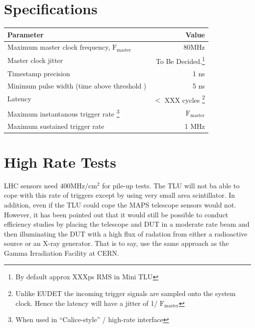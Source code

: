 \section{Specifications}

\begin{tabular}{| l | r |}

\hline

Parameter                                                  & Value \\ \hline \hline

Maximum master clock frequency, $\mathrm{F}_\mathrm{master}$ &  80MHz \\ \hline

Master clock jitter                                        & To Be Decided.\footnote{By default approx XXXps RMS in Mini TLU} \\ \hline

Timestamp precision                                        & 1 ns \\ \hline

Minimum pulse width (time above threshold )                & 5 ns \\ \hline

Latency                                                    &  $<$ XXX cycles \footnote{Unlike EUDET the incoming trigger signals are sampled onto the system clock. Hence the latency will have a jitter of 1/  $\mathrm{F}_\mathrm{master}$} \\ \hline

Maximum instantanous trigger rate \footnote{When used in ``Calice-style'' / high-rate interface}                                                       &  $\mathrm{F}_\mathrm{master}$ \\ \hline

Maximum sustained trigger rate                             &  1 MHz \\ \hline
\end{tabular}

\section{High Rate Tests}

LHC sensors need $400 \mathrm{MHz}/\mathrm{cm}^2$ for pile-up
tests. The TLU will not ba able to cope with this rate of triggers
except by using very small area scintillator. In addition, even if the
TLU could cope the MAPS telescope sensors would not. However, it has
been pointed out\cite{ref:andrei_n} that it would still be possible to
conduct efficiency studies by placing the telescope and DUT in a
moderate rate beam and then illuminating the DUT with a high flux of
radation from either a radioactive source or an X-ray generator. That
is to say, use the same approach as the Gamma Irradiation
Facility\cite{ref:GIF} at CERN.







